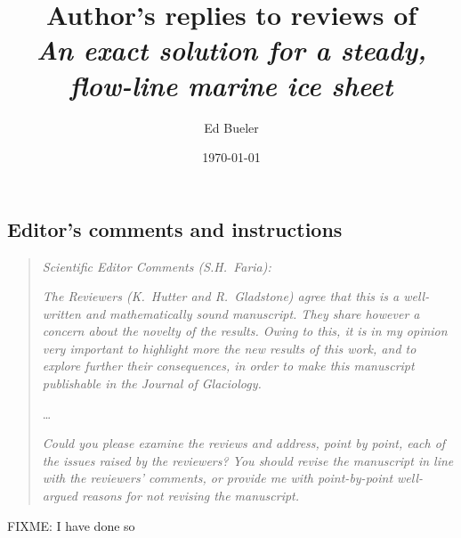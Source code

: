 \documentclass[11pt,reqno]{amsart}
\title[Author's replies to reviews of \emph{An exact solution \dots}]{Author's replies to reviews of \\ \emph{An exact solution for a steady, flow-line marine ice sheet}}
\author{Ed Bueler}
\date{\today}
\begin{document}
\maketitle

\thispagestyle{empty}



\subsection*{Editor's comments and instructions}  \begin{quote}
\emph{Scientific Editor Comments (S.H.~Faria):}

\emph{The Reviewers (K.~Hutter and R.~Gladstone) agree that this is a well-written and mathematically sound manuscript. They share however a concern about the novelty of the results. Owing to this, it is in my opinion very important to highlight more the new results of this work, and to explore further their consequences, in order to make this manuscript publishable in the Journal of Glaciology.}

\dots

\emph{Could you please examine the reviews and address, point by point, each of the issues raised by the reviewers? You should revise the manuscript in line with the reviewers' comments, or provide me with point-by-point well-argued reasons for not revising the manuscript.}
\end{quote}

\noindent FIXME:  I have done so
\end{document}
